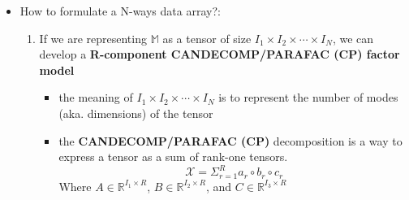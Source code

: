\documentclass[11.5pt,a4paper]{article}
\begin{document}
\begin{itemize}
\begin{enumerate}
        \item The Frobenius norm of a tensor A (denoted as $\Vert \mathbb{A} \Vert_F$) is the square root of the inner product (aka. dot product).
        \begin{equation*}
            \Vert \mathbb{A} \Vert_F = \sqrt{\left< \mathbb{A}, \mathbb{A}\right>}
        \end{equation*}

        \textit{Below are some more information about inner and outer products:}
        \begin{itemize}
            \item inner product (aka. dot product) is represented by the following equation:
            \begin{equation*}
                a \cdot b = a^Tb
            \end{equation*}
            \item the outer product is represented by the following equation:
            \begin{equation*}
                a\cdot b = ab^T
            \end{equation*}
            
            where, $a = \left[a_1, a_2, a_3, \cdots, a_n\right]$ and $b = \left[ b_1, b_2, b_3, \cdots, b_n\right] $
        \end{itemize}

        \item The mode-n matricization (or unfolding of tensor $\mathbb{A}$) is denoted by $mA_{(n)}$
    \end{enumerate}
    \item How to formulate a N-ways data array?:
    \begin{enumerate}
        \item If we are representing $\mathbb{M}$ as a tensor of size $I_1 \times I_2 \times \cdots \times I_N$, we can develop a \textbf{R-component CANDECOMP/PARAFAC (CP) factor model}
        \begin{itemize}
            \item the meaning of $I_1 \times I_2 \times \cdots \times I_N$ is to represent the number of modes (aka. dimensions) of the tensor
            \item the \textbf{CANDECOMP/PARAFAC (CP)} decomposition is a way to express a tensor as a sum of rank-one tensors.
            \begin{equation*}
                \mathcal{X} = \Sigma^R_{r=1}  a_r \circ b_r \circ c_r
            \end{equation*}
            Where $A \in \mathbb{R}^{I_1\times R}$, $B \in \mathbb{R}^{I_2\times R}$, and $C \in \mathbb{R}^{I_3\times R}$


\end{itemize}
\end{enumerate}
\end{itemize}
\end{document}
